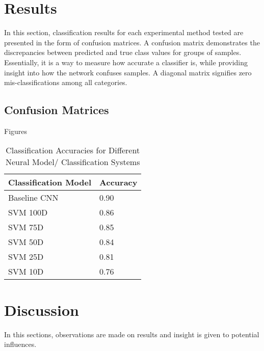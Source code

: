 \documentclass[conference]{IEEEtran}
\begin{document}
\section{Results} \label{Results}

In this section, classification results for each experimental method tested are presented in the form of confusion matrices.  A confusion matrix demonstrates the discrepancies between predicted and true class values for groups of samples.  Essentially, it is a way to measure how accurate a classifier is, while providing insight into how the network confuses samples.  A diagonal matrix signifies zero mis-classifications among all categories.

\subsection{Confusion Matrices}
Figures 

\begin{table}[h!]
	\caption{Classification Accuracies for Different Neural Model/ Classification Systems}
	\label{tab:step1comparison}
	\normalsize
		\begin{tabularx}{\columnwidth}{ |X|X| } 
			\hline
			\centering \textbf{Classification Model}  & \textbf{Accuracy} \\
			\hline
			\centering Baseline CNN & 0.90 \\
			\hline
			\centering SVM 100D & 0.86 \\
			\hline
			\centering SVM 75D & 0.85 \\
			\hline
			\centering SVM 50D & 0.84 \\
			\hline
			\centering SVM 25D & 0.81 \\
			\hline
			\centering SVM 10D & 0.76 \\
			\hline
		\end{tabularx}
\end{table} 
 

\vspace{5cm}
\section{Discussion} \label{Discussion}
In this sections, observations are made on results and insight is given to potential influences.
\end{document}
